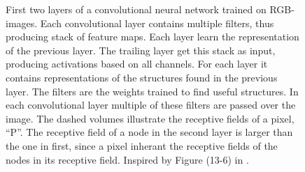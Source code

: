 \begin{figure}
    \caption[Receptive field of pixel in convolutional neural network trained on RGB-image.]{First two layers of a convolutional neural network trained on RGB-images. Each convolutional layer contains multiple filters, thus producing stack of feature maps. Each layer learn the representation of the previous layer. The trailing layer get this stack as input, producing activations based on all channels. For each layer it contains representations of the structures found in the previous layer. The filters are the weights trained to find useful structures. In each convolutional layer multiple of these filters are passed over the image. The dashed volumes illustrate the receptive fields of a pixel, ``P''. The receptive field of a node in the second layer is larger than the one in first, since a pixel inherant the receptive fields of the nodes in its receptive field. Inspired by Figure (13-6) in \cite{OReiley_book}.
    }
    \label{fig:conv_layers}
\end{figure} 
 